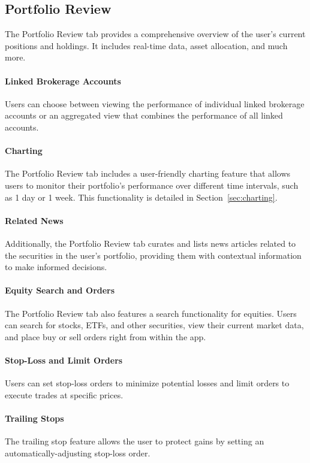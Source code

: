 \subsection{Portfolio Review}
\label{sec:portfolio-review}

The Portfolio Review tab provides a comprehensive overview of the user's current positions and holdings. It includes real-time data, asset allocation, and much more.


\paragraph{Linked Brokerage Accounts}
Users can choose between viewing the performance of individual linked brokerage accounts or an aggregated view that combines the performance of all linked accounts.

\paragraph{Charting}
The Portfolio Review tab includes a user-friendly charting feature that allows users to monitor their portfolio's performance over different time intervals, such as 1 day or 1 week. This functionality is detailed in Section~\ref{sec:charting}.

\paragraph{Related News}
Additionally, the Portfolio Review tab curates and lists news articles related to the securities in the user's portfolio, providing them with contextual information to make informed decisions.

\paragraph{Equity Search and Orders}
The Portfolio Review tab also features a search functionality for equities. Users can search for stocks, ETFs, and other securities, view their current market data, and place buy or sell orders right from within the app.

\paragraph{Stop-Loss and Limit Orders}
Users can set stop-loss orders to minimize potential losses and limit orders to execute trades at specific prices.

\paragraph{Trailing Stops}
The trailing stop feature allows the user to protect gains by setting an automatically-adjusting stop-loss order.

